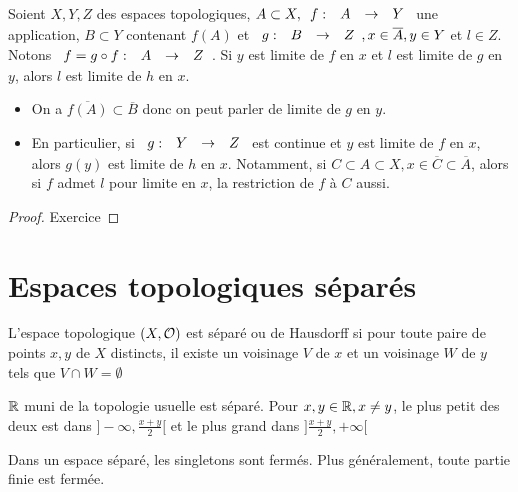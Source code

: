 \documentclass[]{report}
\begin{document}
    \begin{prop}{}{}
        Soient $X,Y,Z$ des espaces topologiques, $A\subset X,\begin{array}{ccccc} f : & A & \to & Y \end{array}$ une application, $B\subset Y$ contenant $f(A)$ et $\begin{array}{ccccc} g : & B & \to & Z \end{array},x\in \overline{A},y\in Y$ et $l\in Z$.\\
        Notons $\begin{array}{ccccc} f=g\circ f : & A & \to & Z \end{array}$. Si $y$ est limite de $f$ en $x$ et $l$ est limite de $g$ en $y$, alors $l$ est limite de $h$ en $x$.
    \end{prop}

    \begin{re}{}{}
        \begin{itemize}
            \item On a $\overline{f(A)}\subset \overline{B}$ donc on peut parler de limite de $g$ en $y$.
            \item En particulier, si $\begin{array}{ccccc} g : & Y & \to & Z \end{array}$ est continue et $y$ est limite de $f$ en $x$, alors $g(y)$ est limite de $h$ en $x$. Notamment, si $C\subset A\subset X,x\in \overline{C}\subset \overline{A}$, alors si $f$ admet $l$ pour limite en $x$, la restriction de $f$ à $C$ aussi.
        \end{itemize}
    \end{re}

    \begin{proof}{}{}
        Exercice
    \end{proof}

    \section{Espaces topologiques séparés}

    \begin{df}{}{}
        L'espace topologique $(X,\mathcal{O})$ est séparé ou de Hausdorff si pour toute paire de points $x,y$ de $X$ distincts, il existe un voisinage $V$ de $x$ et un voisinage $W$ de $y$ tels que $V\cap W=\emptyset$
    \end{df}

    \begin{ex}{}{}
        $\mathbb{R}$ muni de la topologie usuelle est séparé. Pour $x,y\in\mathbb{R},x\neq y$, le plus petit des deux est dans $]-\infty,\frac{x+y}{2}[$ et le plus grand dans $]\frac{x+y}{2},+\infty[$
    \end{ex}

    \begin{prop}{}{}
        Dans un espace séparé, les singletons sont fermés. Plus généralement, toute partie finie est fermée.
    \end{prop}
\end{document}
